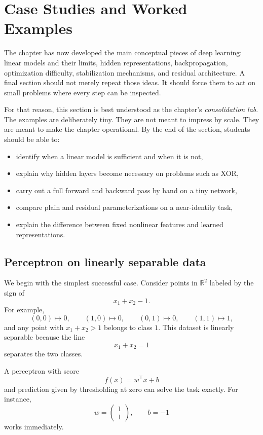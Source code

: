 \section{Case Studies and Worked Examples}
\thispagestyle{plain}

The chapter has now developed the main conceptual pieces of deep learning:
linear models and their limits,
hidden representations,
backpropagation,
optimization difficulty,
stabilization mechanisms,
and residual architecture.
A final section should not merely repeat those ideas.
It should force them to act on small problems where every step can be inspected.

\medskip

For that reason, this section is best understood as the chapter's \emph{consolidation lab}.
The examples are deliberately tiny.
They are not meant to impress by scale.
They are meant to make the chapter operational.
By the end of the section, students should be able to:
\begin{itemize}
    \item identify when a linear model is sufficient and when it is not,
    \item explain why hidden layers become necessary on problems such as XOR,
    \item carry out a full forward and backward pass by hand on a tiny network,
    \item compare plain and residual parameterizations on a near-identity task,
    \item explain the difference between fixed nonlinear features and learned representations.
\end{itemize}

\subsection*{Perceptron on linearly separable data}

We begin with the simplest successful case.
Consider points in $\mathbb R^2$ labeled by the sign of
\[
 x_1+x_2-1.
\]
For example,
\[
(0,0)\mapsto 0,
\qquad
(1,0)\mapsto 0,
\qquad
(0,1)\mapsto 0,
\qquad
(1,1)\mapsto 1,
\]
and any point with $x_1+x_2>1$ belongs to class $1$.
This dataset is linearly separable because the line
\[
 x_1+x_2=1
\]
separates the two classes.

\medskip

A perceptron with score
\[
 f(x)=w^\top x+b
\]
and prediction given by thresholding at zero can solve the task exactly.
For instance,
\[
 w=\begin{pmatrix}1\\1\end{pmatrix},
 \qquad
 b=-1
\]
works immediately.


